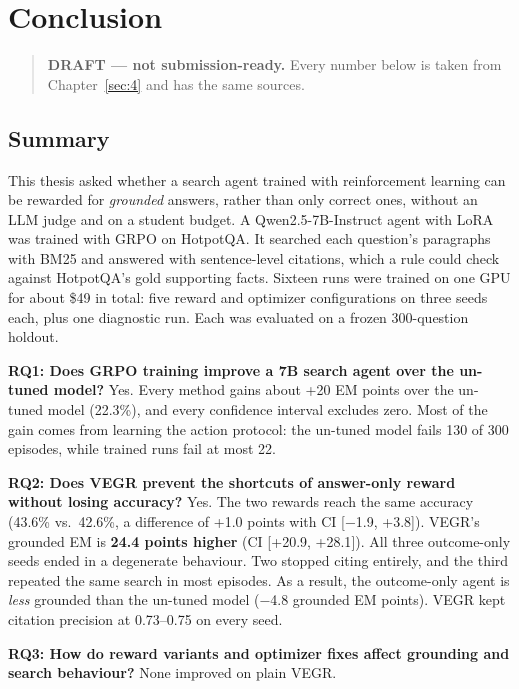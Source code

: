 \chapter{Conclusion}\label{sec:5}

\begin{quote}
\textbf{DRAFT --- not submission-ready.} Every number below is taken
from Chapter~\ref{sec:4} and has the same sources.
\end{quote}

\section{Summary}\label{sec:5.1}

This thesis asked whether a search agent trained with reinforcement
learning can be rewarded for \emph{grounded} answers, rather than only
correct ones, without an LLM judge and on a student budget. A
Qwen2.5-7B-Instruct agent with LoRA was trained with GRPO on HotpotQA.
It searched each question's paragraphs with BM25 and answered with
sentence-level citations, which a rule could check against HotpotQA's
gold supporting facts. Sixteen runs were trained on one GPU for about
\$49 in total: five reward and optimizer configurations on three seeds
each, plus one diagnostic run. Each was evaluated on a frozen
300-question holdout.

\textbf{RQ1: Does GRPO training improve a 7B search agent over the
un-tuned model?} Yes. Every method gains about +20 EM points over the
un-tuned model (22.3\%), and every confidence interval excludes zero.
Most of the gain comes from learning the action protocol: the un-tuned
model fails 130 of 300 episodes, while trained runs fail at most 22.

\textbf{RQ2: Does VEGR prevent the shortcuts of answer-only reward
without losing accuracy?} Yes. The two rewards reach the same accuracy
(43.6\% vs.~42.6\%, a difference of +1.0 points with CI {[}−1.9,
+3.8{]}). VEGR's grounded EM is \textbf{24.4 points higher} (CI
{[}+20.9, +28.1{]}). All three outcome-only seeds ended in a degenerate
behaviour. Two stopped citing entirely, and the third repeated the same
search in most episodes. As a result, the outcome-only agent is
\emph{less} grounded than the un-tuned model (−4.8 grounded EM points).
VEGR kept citation precision at 0.73--0.75 on every seed.

\textbf{RQ3: How do reward variants and optimizer fixes affect grounding
and search behaviour?} None improved on plain VEGR.

